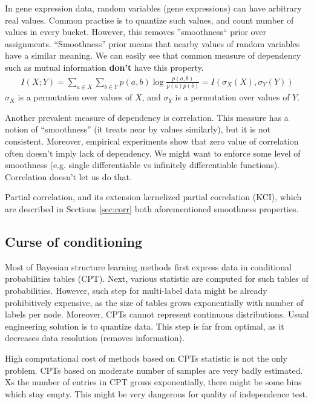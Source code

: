 \documentclass{article} %
\begin{document}
In gene expression data, random variables (gene expressions) can 
have arbitrary real values. Common practise is to quantize such values,
and count number of values in every bucket. However, this removes 
''smoothness`` prior over assignments. ``Smoothness'' prior means that
nearby values of random variables have a similar meaning. We can easily see
that common measure of dependency such as mutual information {\bf don't} have 
this property. 
\begin{align*}
  I(X;Y)=\sum_{a \in X}\sum_{b \in Y} p(a, b)\log{\frac{p(a, b)}{p(a)p(b)}}=I(\sigma_X(X), \sigma_Y(Y))
\end{align*}
$\sigma_X$ is a permutation over values of $X$, and $\sigma_Y$ is
a permutation over values of $Y$.


Another prevalent measure of dependency is correlation. This measure
has a notion of ``smoothness'' (it treats near by values similarly), but
it is not consistent. Moreover, empirical experiments show that zero value
of correlation often doesn't imply lack of dependency. We might want to 
enforce some level of smoothness (e.g. single differentiable vs infinitely 
differentiable functions). Correlation doesn't let us do that. 

Partial correlation, and its extension kernelized partial correlation (KCI), which are described 
in Sections \ref{sec:corr} both aforementioned smoothness properties.


\subsection{Curse of conditioning}\label{sec:curse}
Most of Bayesian structure learning methods first express data in conditional probabilities tables (CPT).
Next, various statistic are computed for such tables of probabilities. However, such step
for multi-label data might be already prohibitively expensive, as the size of tables grows
exponentially with number of labels per node. Moreover, CPTs cannot represent continuous
distributions. Usual engineering solution is to quantize data. This step is far from optimal,
as it decreases data resolution (removes information). 

High computational cost of methods based on CPTs statistic is not the only problem. 
CPTs based on moderate number of samples are very badly estimated. Xs the number
of entries in CPT grows exponentially, there might be some bins which stay empty. This might
be very dangerous for quality of independence test.
\end{document}
